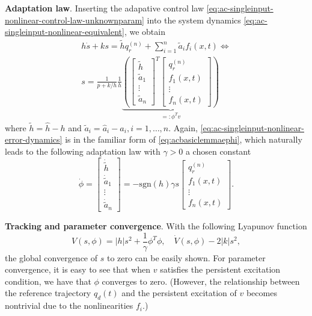\documentclass[
]{book}
\theoremstyle{definition}
\theoremstyle{definition}
\theoremstyle{definition}
\theoremstyle{definition}
\theoremstyle{remark}
\begin{document}
\textbf{Adaptation law}. Inserting the adapative control law \eqref{eq:ac-singleinput-nonlinear-control-law-unknownparam} into the system dynamics \eqref{eq:ac-singleinput-nonlinear-equivalent}, we obtain
\begin{align}
h \dot{s} + ks = \tilde{h} q_r^{(n)} + \sum_{i=1}^n \tilde{a}_i f_i (x,t) \Longleftrightarrow \\
s = \frac{1}{p + k/h} \frac{1}{h} \underbrace{ \left( 
    \begin{bmatrix} \tilde{h} \\ \tilde{a}_1 \\ \vdots \\ \tilde{a}_n \end{bmatrix}^T
    \begin{bmatrix} q_r^{(n)} \\ f_1(x,t) \\ \vdots \\ f_n(x,t) \end{bmatrix}
    \right)}_{=:\phi^T v}
\label{eq:ac-singleinput-nonlinear-error-dynamics}
\end{align}
where \(\tilde{h} = \hat{h} - h\) and \(\tilde{a}_i = \hat{a}_i - a_i,i=1,\dots,n\). Again, \eqref{eq:ac-singleinput-nonlinear-error-dynamics} is in the familiar form of \eqref{eq:acbasiclemmaephi}, which naturally leads to the following adaptation law with \(\gamma > 0\) a chosen constant
\begin{equation}
\dot{\phi} = \begin{bmatrix} \dot{\tilde{h}} \\ \dot{\tilde{a}}_1 \\ \vdots \\ \dot{\tilde{a}}_n \end{bmatrix} = - \mathrm{sgn}(h) \gamma s \begin{bmatrix} q_r^{(n)} \\ f_1(x,t) \\ \vdots \\ f_n(x,t) \end{bmatrix}.
\label{eq:ac-singleinput-nonlinear-adaptation-law}
\end{equation}

\textbf{Tracking and parameter convergence}. With the following Lyapunov function
\[
V(s,\phi) = |h| s^2 + \frac{1}{\gamma} \phi^T \phi, \quad \dot{V}(s,\phi) -2|k| s^2,
\]
the global convergence of \(s\) to zero can be easily shown. For parameter convergence, it is easy to see that when \(v\) satisfies the persistent excitation condition, we have that \(\phi\) converges to zero. (However, the relationship between the reference trajectory \(q_d(t)\) and the persistent excitation of \(v\) becomes nontrivial due to the nonlinearities \(f_i\).)
\end{document}
